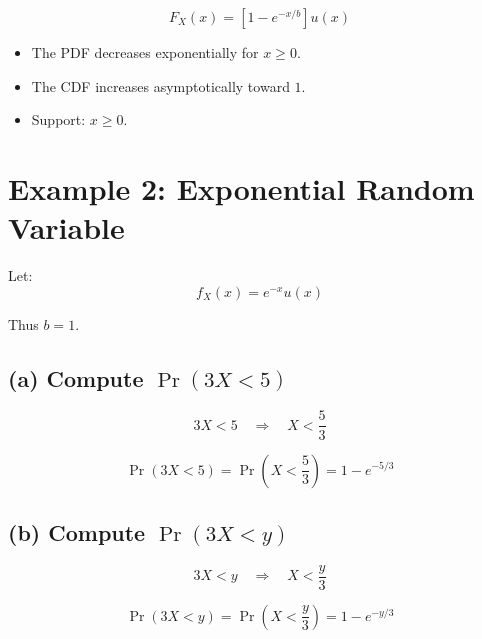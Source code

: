 \documentclass[12pt]{article}
\begin{document}
\[
F_X(x) = \left[1 - e^{-x/b}\right] u(x)
\]

\begin{itemize}
    \item The PDF decreases exponentially for $x \ge 0$.
    \item The CDF increases asymptotically toward $1$.
    \item Support: $x \ge 0$.
\end{itemize}

\section{Example 2: Exponential Random Variable}

Let:
\[
f_X(x) = e^{-x} u(x)
\]

Thus $b=1$.

\subsection*{(a) Compute $\Pr(3X < 5)$}

\[
3X < 5 \quad \Rightarrow \quad X < \frac{5}{3}
\]

\[
\Pr(3X < 5)
= \Pr\left(X < \frac{5}{3}\right)
= 1 - e^{-5/3}
\]

\subsection*{(b) Compute $\Pr(3X < y)$}

\[
3X < y \quad \Rightarrow \quad X < \frac{y}{3}
\]

\[
\Pr(3X < y)
= \Pr\left(X < \frac{y}{3}\right)
= 1 - e^{-y/3}
\]
\end{document}
